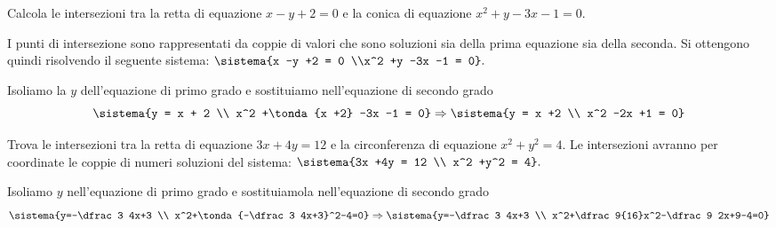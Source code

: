 \begin{esempio}{}{}
Calcola le intersezioni tra la retta di equazione \(x -y +2 = 0\) e la 
conica di equazione \(x^2 +y -3x -1 = 0\).

\medskip
I punti di intersezione sono rappresentati da coppie di valori che sono 
soluzioni sia della prima equazione sia della seconda.
Si ottengono quindi risolvendo il seguente sistema: 
\(\sistema{x -y +2 = 0 \\x^2 +y -3x -1 = 0}.\)

Isoliamo la \(y\) dell'equazione di primo grado e sostituiamo 
nell'equazione di secondo grado 
\[\sistema{y = x + 2 \\
x^2 +\tonda{x +2} -3x -1 = 0} 
\Rightarrow\sistema{y = x +2 \\
x^2 -2x +1 = 0}\]


\end{esempio}

\begin{esempio}{}{}
Trova le intersezioni tra la retta di equazione \(3x +4y = 12\) e la 
circonferenza di equazione \(x^2 +y^2 = 4\).
\medskip 
Le intersezioni avranno per coordinate le coppie di numeri soluzioni del 
sistema:  \(\sistema{3x +4y = 12 \\ x^2 +y^2 = 4}.\)

Isoliamo \(y\) nell'equazione di primo grado e sostituiamola nell'equazione 
di secondo grado 
\[\sistema{y=-\dfrac 3 4x+3 \\
x^2+\tonda{-\dfrac 3 4x+3}^2-4=0} 
\Rightarrow\sistema{y=-\dfrac 3 4x+3 \\
x^2+\dfrac 9{16}x^2-\dfrac 9 2x+9-4=0} 
\]

\end{esempio}


